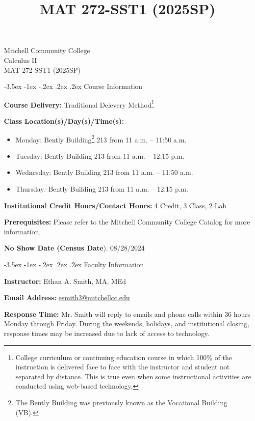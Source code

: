 \documentclass{article}
\title{MAT 272-SST1 (2025SP)}
\makeatletter
\renewcommand\section{\@startsection{section}{1}{0pt}%
  {-3.5ex \@plus -1ex \@minus -.2ex}%
  {.2ex \@plus.2ex}%
  {\normalfont\Large\bfseries}} %
\makeatother
\begin{document}
\begin{center}
    {\huge Mitchell Community College} \\[6pt]
    {\Large Calculus II} \\[6pt]
    {\Large MAT 272-SST1 (2025SP)}
\end{center}

\section{Course Information}

\textbf{Course Delivery:} Traditional Delevery Method\footnote{College curriculum or continuing education course in which 100\% of the instruction is delivered face to face with the instructor and student not  separated by distance. This is true even when some instructional activities are conducted using web‐based technology.}

\textbf{Class Location(s)/Day(s)/Time(s):}

\begin{itemize}
\item Monday: Bently Building\footnote{The Bently Building was previously known as the Vocational Building (VB).} 213 from 11 a.m. -- 11:50 a.m.
\item Tuesday: Bently Building 213 from 11 a.m. -- 12:15 p.m.
\item Wednesday: Bently Building 213 from 11 a.m. -- 11:50 a.m.
\item Thursday: Bently Building 213 from 11 a.m. -- 12:15 p.m.
\end{itemize}

\textbf{Institutional Credit Hours/Contact Hours:} 4 Credit, 3 Class, 2 Lab

\textbf{Prerequisites:} Please refer to the Mitchell Community College Catalog for more information.

\textbf{No Show Date (Census Date}): 08/28/2024

\section{Faculty Information}

\textbf{Instructor:} Ethan A. Smith, MA, MEd

\textbf{Email Address:} \href{mailto:esmith3@mitchellcc.edu}{esmith3@mitchellcc.edu}

\textbf{Response Time:} Mr. Smith will reply to emails and phone calls within 36 hours Monday through Friday. During the weekends, holidays, and institutional closing, response times may be increased due to lack of access to technology.
\end{document}

